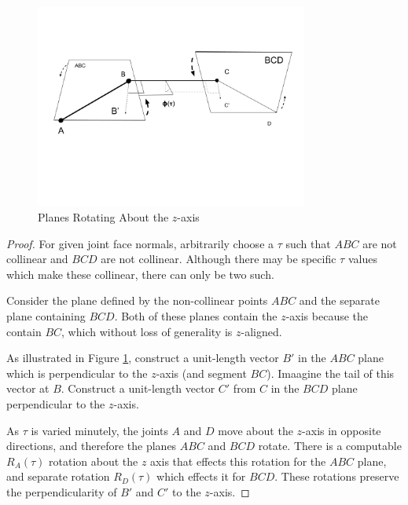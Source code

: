 \documentclass[11pt]{article}
\begin{document}
{\begin{figure}
     \centering
     \includegraphics[width=0.80\textwidth]{figures/RotatingPlane.png}
     \caption{Planes Rotating About the $z$-axis}
  \label{fig:rotatingplane}
\end{figure}



\begin{proof}

    For given joint face normals,
    arbitrarily choose a $\tau$ such that $ABC$ are not collinear and
    $BCD$ are not collinear. Although there may be specific $\tau$ values
    which make these collinear, there can only be two such.

    Consider the plane defined by the non-collinear points $ABC$ and
    the separate plane containing $BCD$. Both of these planes contain
    the $z$-axis because the contain $BC$, which without loss of generality
    is $z$-aligned.

    As illustrated in Figure \ref{fig:rotatingplane},
    construct a unit-length vector $B'$ in the $ABC$ plane which is perpendicular
    to the $z$-axis (and segment $BC$). Imaagine the tail of this
    vector at $B$. Construct a unit-length vector $C'$ from $C$ in the $BCD$ plane
    perpendicular to the $z$-axis.

    As $\tau$ is varied minutely, the joints $A$ and $D$ move about
    the $z$-axis in opposite directions, and therefore
    the planes $ABC$ and $BCD$ rotate. There is a computable $R_A(\tau)$
    rotation about the $z$ axis that effects this rotation for the
    $ABC$ plane, and
    separate rotation $R_D(\tau)$ which effects it for $BCD$.
    These rotations preserve the perpendicularity of $B'$ and $C'$ to
    the $z$-axis.


\end{proof}}
\end{document}
